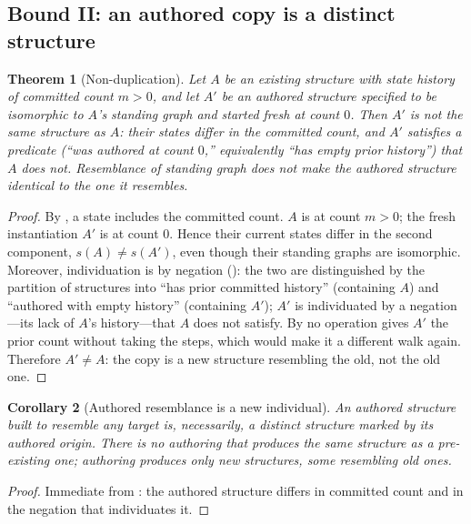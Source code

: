 \documentclass[11pt,a4paper]{article}
\theoremstyle{thmstyle}
\newtheorem{theorem}{Theorem}[section]
\newtheorem{corollary}[theorem]{Corollary}
\theoremstyle{definition}
\theoremstyle{remark}
\newcommand{\Agent}{A}                    %
\begin{document}
\subsection{Bound II: an authored copy is a distinct structure}

\begin{theorem}[Non-duplication]
\label{thm:nondup}
Let $\Agent$ be an existing structure with state history of committed count $m>0$,
and let $\Agent'$ be an authored structure specified to be isomorphic to
$\Agent$'s standing graph and started fresh at count $0$. Then $\Agent'$ is not
the same structure as $\Agent$: their states differ in the committed count, and
$\Agent'$ satisfies a predicate \textup{(}``was authored at count $0$,'' equivalently
``has empty prior history''\textup{)} that $\Agent$ does not. Resemblance of
standing graph does not make the authored structure identical to the one it
resembles.
\end{theorem}

\begin{proof}
By , a state includes the committed count. $\Agent$ is at count
$m>0$; the fresh instantiation $\Agent'$ is at count $0$. Hence their current
states differ in the second component, $s(\Agent)\neq s(\Agent')$, even though
their standing graphs are isomorphic. Moreover, individuation is by negation
(): the two are distinguished by the partition of structures
into ``has prior committed history'' (containing $\Agent$) and ``authored with
empty history'' (containing $\Agent'$); $\Agent'$ is individuated by a
negation---its lack of $\Agent$'s history---that $\Agent$ does not satisfy. By
 no operation gives $\Agent'$ the prior count without taking
the steps, which would make it a different walk again. Therefore $\Agent'\neq
\Agent$: the copy is a new structure resembling the old, not the old one.
\end{proof}

\begin{corollary}[Authored resemblance is a new individual]
\label{cor:new-individual}
An authored structure built to resemble any target is, necessarily, a distinct
structure marked by its authored origin. There is no authoring that produces
\emph{the same} structure as a pre-existing one; authoring produces only new
structures, some resembling old ones.
\end{corollary}

\begin{proof}
Immediate from : the authored structure differs in committed
count and in the negation that individuates it.
\end{proof}
\end{document}

